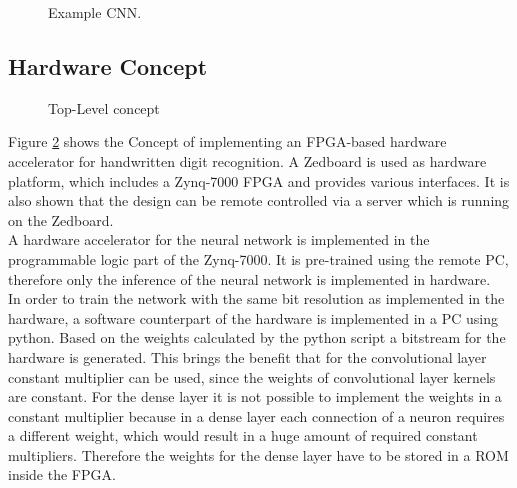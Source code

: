 \begin{figure}[htbp]
{\begin{tikzpicture}

%

	\end{tikzpicture}
	}
	\caption{Example CNN.}
	\label{fig:network-concept}
\end{figure}

\subsection{Hardware Concept}
\begin{figure}[h]
	\centering
	
	\caption[Top-Level concept.]{Top-Level concept}
	\label{FIG:concept}
\end{figure}
\noindent
Figure \ref{FIG:concept} shows the Concept of implementing an FPGA-based hardware accelerator for handwritten digit recognition. A Zedboard is used as hardware platform, which includes a Zynq-7000 FPGA and provides various interfaces. It is also shown that the design can be remote controlled via a server which is running on the Zedboard. \\
A hardware accelerator for the neural network is implemented in the programmable logic part of the Zynq-7000. It is pre-trained using the remote PC, therefore only the inference of the neural network is implemented in hardware. \\
In order to train the network with the same bit resolution as implemented in the hardware, a software counterpart of the hardware is implemented in a PC using python. 
Based on the weights calculated by the python script a bitstream for the hardware is generated. This brings the benefit that for the convolutional layer constant multiplier can be used, since the weights of convolutional layer kernels are constant. For the dense layer it is not possible to implement the weights in a constant multiplier because in a dense layer each connection of a neuron requires a different weight, which would result in a huge amount of required constant multipliers. Therefore the weights for the dense layer have to be stored in a ROM inside the FPGA.   \\
